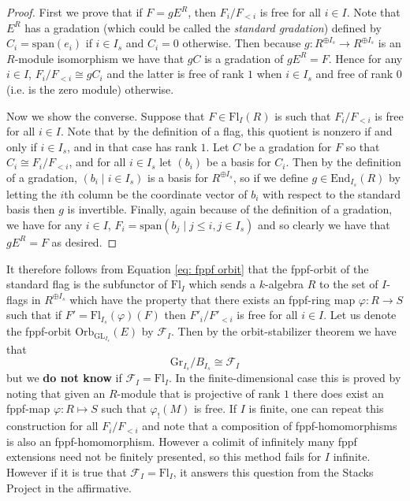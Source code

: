 \documentclass[oneside,11pt]{amsart}
\newcommand{\mF}{\ensuremath{\mathcal{F}}}
\newcommand{\GL}{\ensuremath{\text{GL}}}
\newcommand{\Fl}{\ensuremath{\text{Fl}}}
\newcommand{\Gr}{\ensuremath{\text{Gr}}}
\newcommand{\End}{\ensuremath{\text{End}}}
\newcommand{\Orb}{\ensuremath{\text{Orb}}}
\newcommand{\Span}{\ensuremath{\text{span}}}
\theoremstyle{definition}
\newtheorem{proof techniques}{Proof Techniques}
\begin{document}
\begin{proof}
First we prove that if $F = gE^R$, then $F_i / F_{<i}$ is free for all $i \in I$. Note that $E^R$ has a gradation (which could be called the \emph{standard gradation}) defined by $C_i = \Span(e_i)$ if $i \in I_s$ and $C_i = 0$ otherwise. Then because $g : R^{\oplus I_s} \to R^{\oplus I_s}$ is an $R$-module isomorphism we have that $gC$ is a gradation of $g E^R = F$. Hence for any $i \in I$, $F_i/ F_{<i} \cong gC_i$ and the latter is free of rank $1$ when $i \in I_s$ and free of rank $0$ (i.e. is the zero module) otherwise. 

Now we show the converse. Suppose that $F \in \Fl_I(R)$ is such that $F_i / F_{<i}$ is free for all $i \in I$. Note that by the definition of a flag, this quotient is nonzero if and only if $i \in I_s$, and in that case has rank $1$. Let $C$ be a gradation for $F$ so that $C_i \cong F_i / F_{<i}$, and for all $i \in I_s$ let $(b_i)$ be a basis for $C_i$. Then by the definition of a gradation, $(b_i \mid i \in I_s )$ is a basis for $R^{\oplus I_s}$, so if we define $g \in \End_{I_s}(R)$ by letting the $i$th column be the coordinate vector of $b_i$ with respect to the standard basis then $g$ is invertible. Finally, again because of the definition of a gradation, we have for any $i \in I$, $F_i = \Span(b_j \mid j \leq i, j \in I_s)$ and so clearly we have that $g E^R = F$ as desired. 
\end{proof}


It therefore follows from Equation \ref{eq: fppf orbit} that the fppf-orbit of the standard flag is the subfunctor of $\Fl_I$ which sends a $k$-algebra $R$ to the set of $I$-flags in $R^{\oplus I_s}$ which have the property that there exists an fppf-ring map $\varphi: R \to S$ such that if $F' = \Fl_{I_s}(\varphi)(F)$ then $F'_i / F'_{<i}$ is free for all $i \in I$. Let us denote the fppf-orbit $\Orb_{\GL_{I_s}}(E)$ by $\mF_I$. Then by the orbit-stabilizer theorem we have that 
\begin{equation*}
\Gr_{I_s} / B_{I_s} \cong \mF_I
\end{equation*}
but we \textbf{do not know} if $\mF_I = \Fl_I$. In the finite-dimensional case this is proved by noting that given an $R$-module that is projective of rank $1$ there does exist an fppf-map $\varphi: R \mapsto S$ such that $\varphi_!(M)$ is free. If $I$ is finite, one can repeat this construction for all $F_i / F_{<i}$ and note that a composition of fppf-homomorphisms is also an fppf-homomorphism. However a colimit of infinitely many fppf extensions need not be finitely presented, so this method fails for $I$ infinite. However if it is true that $\mF_I = \Fl_I$, it answers this \cite[{05VF}]{stacks-project} question from the Stacks Project in the affirmative. 
\end{document}
